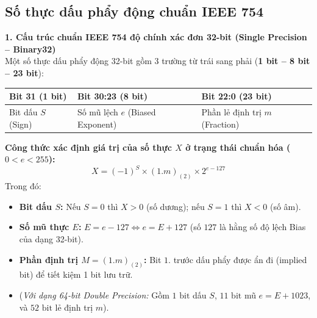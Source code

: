 \subsection{Số thực dấu phẩy động chuẩn IEEE 754}

\textbf{1. Cấu trúc chuẩn IEEE 754 độ chính xác đơn 32-bit (Single Precision -- Binary32)}\\
Một số thực dấu phẩy động 32-bit gồm 3 trường từ trái sang phải (\textbf{1 bit -- 8 bit -- 23 bit}):
\begin{center}
\renewcommand{\arraystretch}{1.25}
\begin{tabularx}{0.85\linewidth}{|C{2.8cm}|C{4.2cm}|Z|}
\hline
\textbf{Bit 31 (1 bit)} & \textbf{Bit 30:23 (8 bit)} & \textbf{Bit 22:0 (23 bit)} \\ \hline
Bit dấu $S$ (Sign) & Số mũ lệch $e$ (Biased Exponent) & Phần lẻ định trị $m$ (Fraction) \\ \hline
\end{tabularx}
\end{center}
\textbf{Công thức xác định giá trị của số thực $X$ ở trạng thái chuẩn hóa ($0 < e < 255$):}
$$X = (-1)^S \times (1.m)_{(2)} \times 2^{e - 127}$$
Trong đó:
\begin{itemize}
    \item \textbf{Bit dấu $S$:} Nếu $S = 0$ thì $X > 0$ (số dương); nếu $S = 1$ thì $X < 0$ (số âm).
    \item \textbf{Số mũ thực $E$:} $E = e - 127 \iff e = E + 127$ (số $127$ là hằng số độ lệch Bias của dạng 32-bit).
    \item \textbf{Phần định trị $M = (1.m)_{(2)}$:} Bit $1.$ trước dấu phẩy được ẩn đi (implied bit) để tiết kiệm 1 bit lưu trữ.
    \item (\textit{Với dạng 64-bit Double Precision:} Gồm $1\text{ bit}$ dấu $S$, $11\text{ bit}$ mũ $e = E + 1023$, và $52\text{ bit}$ lẻ định trị $m$).
\end{itemize}

